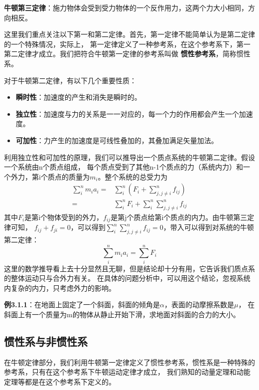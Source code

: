 \documentclass{article}
\begin{document}
    \textbf{牛顿第三定律}：施力物体会受到受力物体的一个反作用力，这两个力大小相同，方向相反。

    这里我们重点关注以下第一和第二定律。首先，第一定律不能简单认为是第二定律的一个特殊情况，实际上，
    第一定律定义了一种参考系，在这个参考系下，第一第二定律才成立。我们把符合牛顿第一定律的参考系叫做
    \textbf{惯性参考系}，简称惯性系。

    对于牛顿第二定律，有以下几个重要性质：
    \begin{itemize}[itemsep=-5pt]
        \item \textbf{瞬时性}：加速度的产生和消失是瞬时的。
        \item \textbf{独立性}：加速度与力的关系是一一对应的，每一个力的作用都会产生一个加速度。
        \item \textbf{可加性}：力产生的加速度是可线性叠加的，其叠加满足矢量加法。
    \end{itemize}
    利用独立性和可加性的原理，我们可以推导出一个质点系统的牛顿第二定律。假设一个系统由n个质点组成，
    每个质点受到了其他n-1个质点的力（系统内力）和一个外力，第i个质点的质量为\(m_i\)。整个系统的总受力为
    \begin{align*}
        \sum_i^n m_i a_i =& \sum_i^n (F_i +  \sum_{j,j\ne i}^{n}f_{ij}) \\
                         =& \sum_i^n F_i + \sum_i^n \sum_{j,j\ne i}^{n}f_{ij}
    \end{align*}
    其中\(F_i\)是第i个物体受到的外力，\(f_{ij}\)是第j个质点给第i个质点的内力。由牛顿第三定律可知，
    \(f_{ij} + f_{ji} = 0\)，可以得到\(\sum_i^n \sum_{j,j\ne i}^{n}f_{ij} = 0\)，带入可以得到对系统的牛顿第二定律：
    \begin{equation*}
        \sum_i^n m_i a_i = \sum_i^n F_i
    \end{equation*}
    这里的数学推导看上去十分显然且无聊，但是结论却十分有用，它告诉我们质点系的整体运动只与合外力有关。
    在具体的问题分析中，可以用这个结论，忽视系统内复杂的内力，只考虑外力的影响。

    \textbf{例3.1.1}：在地面上固定了一个斜面，斜面的倾角是\(\alpha\)，表面的动摩擦系数是\(\mu\)，
    在斜面上有一个质量为m的物体从静止开始下滑，求地面对斜面的合力的大小。

    \subsection{惯性系与非惯性系}
    在牛顿定律部分，我们利用牛顿第一定律定义了惯性参考系，惯性系是一种特殊的参考系，只有在这个参考系下牛顿运动定律才成立，
    我们熟知的动量定理和动能定理等都是在这个参考系下定义的。
\end{document}
